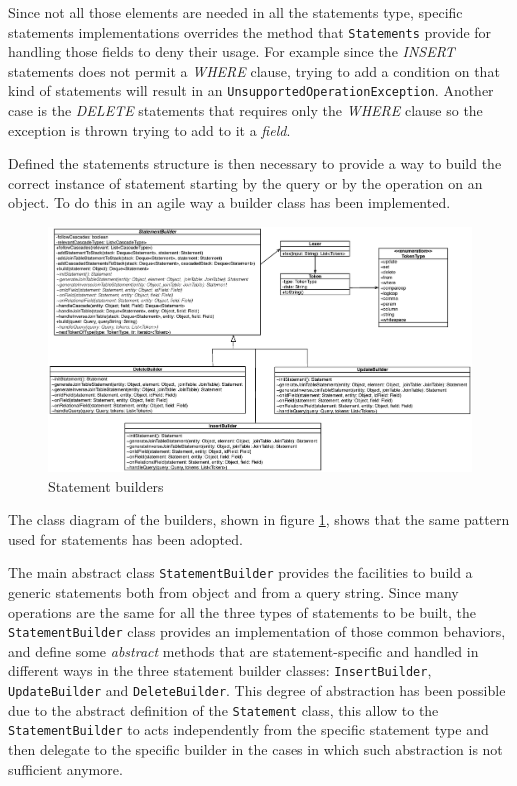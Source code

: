 \noindent Since not all those elements are needed in all the statements type, specific statements implementations overrides the method that \texttt{Statements} provide for handling those fields to deny their usage. For example since the \textit{INSERT} statements does not permit a \textit{WHERE} clause, trying to add a condition on that kind of statements will result in an \texttt{UnsupportedOperationException}. Another case is the \textit{DELETE} statements that requires only the \textit{WHERE} clause so the exception is thrown trying to add to it a \textit{field}.

\newparagraph Defined the statements structure is then necessary to provide a way to build the correct instance of statement starting by the query or by the operation on an object.
To do this in an agile way a builder class has been implemented.

\begin{figure}[tbh]
  \includegraphics[width=16cm]{images/builders}
  \caption{Statement builders}
  \label{fig:builders}
\end{figure} 

\noindent The class diagram of the builders, shown in figure \ref{fig:builders}, shows that the same pattern used for statements has been adopted.

\noindent The main abstract class \texttt{StatementBuilder} provides the facilities to build a generic statements both from object and from a query string.
Since many operations are the same for all the three types of statements to be built, the \texttt{StatementBuilder} class provides an implementation of those common behaviors, and define some \textit{abstract} methods that are statement-specific and handled in different ways in the three statement builder classes: \texttt{InsertBuilder}, \texttt{UpdateBuilder} and \texttt{DeleteBuilder}.
This degree of abstraction has been possible due to the abstract definition of the \texttt{Statement} class, this allow to the \texttt{StatementBuilder} to acts independently from the specific statement type and then delegate to the specific builder in the cases in which such abstraction is not sufficient anymore.

